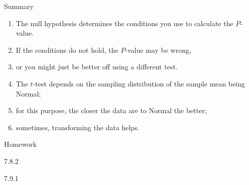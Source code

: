 \begin{frame}{Summary}
  \begin{enumerate}
  \item The null hypothesis determines the conditions you use to calculate the $P$-value.
  \item If the conditions do not hold, the $P$-value may be wrong,
  \item or you might just be better off using a different test.
  \item The $t$-test depends on the sampling distribution of the sample mean being Normal;
  \item for this purpose, the closer the data are to Normal the better;
  \item sometimes, transforming the data helps.
  \end{enumerate}
\end{frame}

\begin{frame}{Homework}
  \begin{center}

  7.8.2

  \vspace{2em}

  7.9.1


  \end{center}
\end{frame}








